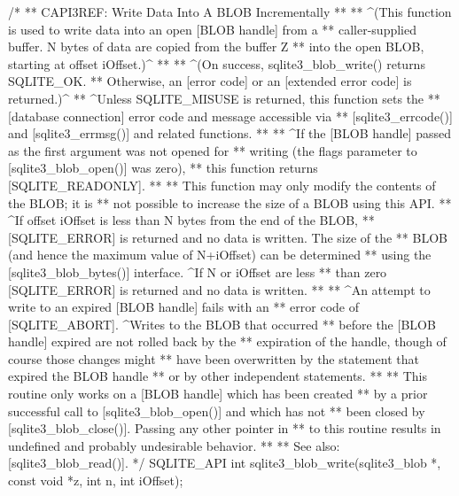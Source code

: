 \begin{Codex}[label=sqlite3.h,numbers=left]
{/*
** CAPI3REF: Write Data Into A BLOB Incrementally
**
** ^(This function is used to write data into an open [BLOB handle] from a
** caller-supplied buffer. N bytes of data are copied from the buffer Z
** into the open BLOB, starting at offset iOffset.)^
**
** ^(On success, sqlite3_blob_write() returns SQLITE_OK.
** Otherwise, an  [error code] or an [extended error code] is returned.)^
** ^Unless SQLITE_MISUSE is returned, this function sets the 
** [database connection] error code and message accessible via 
** [sqlite3_errcode()] and [sqlite3_errmsg()] and related functions. 
**
** ^If the [BLOB handle] passed as the first argument was not opened for
** writing (the flags parameter to [sqlite3_blob_open()] was zero),
** this function returns [SQLITE_READONLY].
**
** This function may only modify the contents of the BLOB; it is
** not possible to increase the size of a BLOB using this API.
** ^If offset iOffset is less than N bytes from the end of the BLOB,
** [SQLITE_ERROR] is returned and no data is written. The size of the 
** BLOB (and hence the maximum value of N+iOffset) can be determined 
** using the [sqlite3_blob_bytes()] interface. ^If N or iOffset are less 
** than zero [SQLITE_ERROR] is returned and no data is written.
**
** ^An attempt to write to an expired [BLOB handle] fails with an
** error code of [SQLITE_ABORT].  ^Writes to the BLOB that occurred
** before the [BLOB handle] expired are not rolled back by the
** expiration of the handle, though of course those changes might
** have been overwritten by the statement that expired the BLOB handle
** or by other independent statements.
**
** This routine only works on a [BLOB handle] which has been created
** by a prior successful call to [sqlite3_blob_open()] and which has not
** been closed by [sqlite3_blob_close()].  Passing any other pointer in
** to this routine results in undefined and probably undesirable behavior.
**
** See also: [sqlite3_blob_read()].
*/
SQLITE_API int sqlite3_blob_write(sqlite3_blob *, const void *z, int n, int iOffset);

}
\end{Codex}
